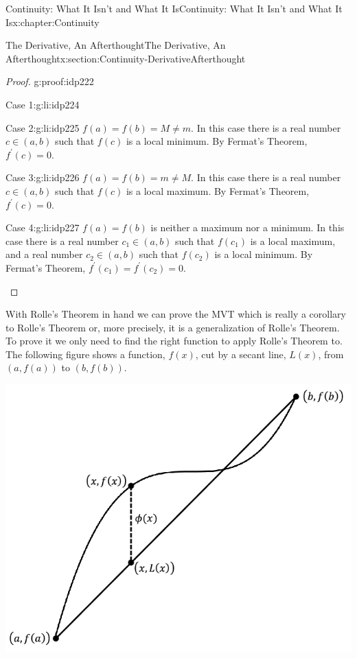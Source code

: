 \begin{chapterptx}{Continuity: What It Isn't and What It Is}{}{Continuity: What It Isn't and What It Is}{}{}{x:chapter:Continuity}
\begin{sectionptx}{The Derivative, An Afterthought}{}{The Derivative, An Afterthought}{}{}{x:section:Continuity-DerivativeAfterthought}
\begin{proof}{}{g:proof:idp222}
\begin{descriptionlist}
\begin{dlimedium}{Case 1:}{g:li:idp224}
				\end{dlimedium}%
				\begin{dlimedium}{Case 2:}{g:li:idp225}%
					\(f(a)=f(b)=M\neq m\). In this case there is a real number \(c\in(a,b)\) such that \(f(c)\) is a local minimum. By Fermat's Theorem, \(f^\prime(c)=0\).%
				\end{dlimedium}%
				\begin{dlimedium}{Case 3:}{g:li:idp226}%
					\(f(a)=f(b)=m\neq M\). In this case there is a real number \(c\in(a,b)\) such that \(f(c)\) is a local maximum. By Fermat's Theorem, \(f^\prime(c)=0\).%
				\end{dlimedium}%
				\begin{dlimedium}{Case 4:}{g:li:idp227}%
					\(f(a)=f(b)\) is neither a maximum nor a minimum. In this case there is a real number \(c_1\in(a,b)\) such that \(f(c_1)\) is a local maximum, and a real number \(c_2\in(a,b)\) such that \(f(c_2)\) is a local minimum. By Fermat's Theorem, \(f^\prime(c_1)=f^\prime(c_2)=0\).%
				\end{dlimedium}%
			\end{descriptionlist}
		\end{proof}
		With Rolle's Theorem in hand we can prove the MVT which is really a corollary to Rolle's Theorem or, more precisely, it is a generalization of Rolle's Theorem. To prove it we only need to find the right function to apply Rolle's Theorem to. The following figure shows a function, \(f(x)\), cut by a secant line, \(L(x)\), from \((a, f(a))\) to \((b,f(b))\).%
		\begin{image}{0.22}{0.56}{0.22}%
			\includegraphics[width=\linewidth]{external/images/MVT.png}

\end{image}
\end{sectionptx}
\end{chapterptx}
